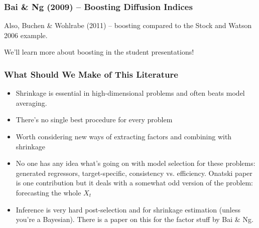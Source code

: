 \documentclass[handout]{beamer}
\begin{document}
\begin{frame}[c]\frametitle{Bai \& Ng (2009) -- Boosting Diffusion Indices}
    
Also, Buchen \& Wohlrabe (2011) -- boosting compared to the Stock and Watson 2006 example.

We'll learn more about boosting in the student presentations!
\end{frame}
\begin{frame}[c]\frametitle{What Should We Make of This Literature}
    
\begin{itemize}
	\item Shrinkage is essential in high-dimensional problems and often beats model averaging.
	\item There's no single best procedure for every problem
	\item Worth considering new ways of extracting factors and combining with shrinkage
	\item No one has any idea what's going on with model selection for these problems: generated regressors, target-specific, consistency vs. efficiency. Onatski paper is one contribution but it deals with a somewhat odd version of the problem: forecasting the whole $X_t$
	\item Inference is very hard post-selection and for shrinkage estimation (unless you're a Bayesian). There is a paper on this for the factor stuff by Bai \& Ng.
\end{itemize}

\end{frame}
\end{document}
